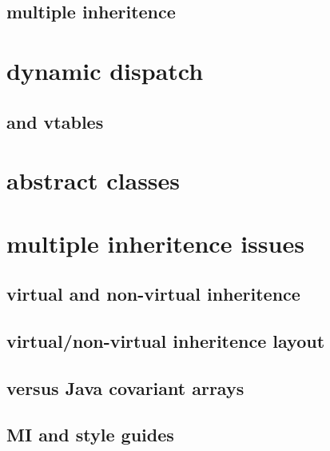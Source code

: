 

\subsection{multiple inheritence}



\section{dynamic dispatch}



\subsection{and vtables}



\section{abstract classes}



\section{multiple inheritence issues}

\subsection{virtual and non-virtual inheritence}



%

\subsection{virtual/non-virtual inheritence layout}



\subsection{versus Java covariant arrays}



\subsection{MI and style guides}


